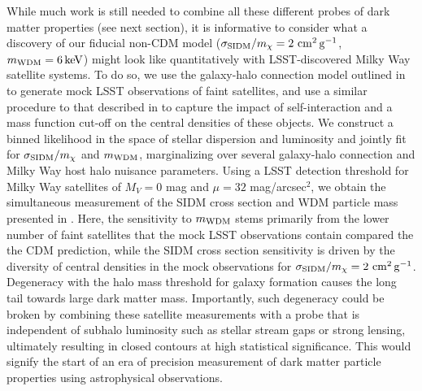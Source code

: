 While much work is still needed to combine all these different probes of dark matter properties (see next section), it is informative to consider what a discovery of our fiducial non-CDM model ($\sigma_{\rm SIDM}/m_\chi = 2 \mathrm{\,\mathrm{\,cm}^2\mathrm{\,g}^{-1}}$, $m_{\rm WDM} = 6 \mathrm{\,keV}$) might look like quantitatively with LSST-discovered Milky Way satellite systems. To do so, we use the galaxy-halo connection model outlined in \citet{Nadler:2018} to generate mock LSST observations of faint satellites, and use a similar procedure to that described in  to capture the impact of self-interaction and a mass function cut-off on the central densities of these objects. We construct a binned likelihood in the space of stellar dispersion and luminosity and jointly fit for $\sigma_{\rm SIDM}/m_\chi$ and $m_{\rm WDM}$, marginalizing over several galaxy-halo connection and Milky Way host halo nuisance parameters. Using a LSST detection threshold for Milky Way satellites of $M_V = 0$ mag and $\mu=32$ mag/arcsec$^2$, we obtain the simultaneous measurement of the SIDM cross section and WDM particle mass presented in . Here, the sensitivity to $m_{\rm WDM}$ stems primarily from the lower number of faint satellites that the mock LSST observations contain compared the the CDM prediction, while the SIDM cross section sensitivity is driven by the diversity of central densities in the mock observations for $\sigma_{\rm SIDM}/m_\chi = 2 \mathrm{\,\mathrm{\,cm}^2\mathrm{\,g}^{-1}}$. Degeneracy with the halo mass threshold for galaxy formation causes the long tail towards large dark matter mass. Importantly, such degeneracy could be broken by combining these satellite measurements with a probe that is independent of subhalo luminosity such as stellar stream gaps or strong lensing, ultimately resulting in closed contours at high statistical significance. This would signify the start of an era of precision measurement of dark matter particle properties using astrophysical observations.


\vspace{1em} 

